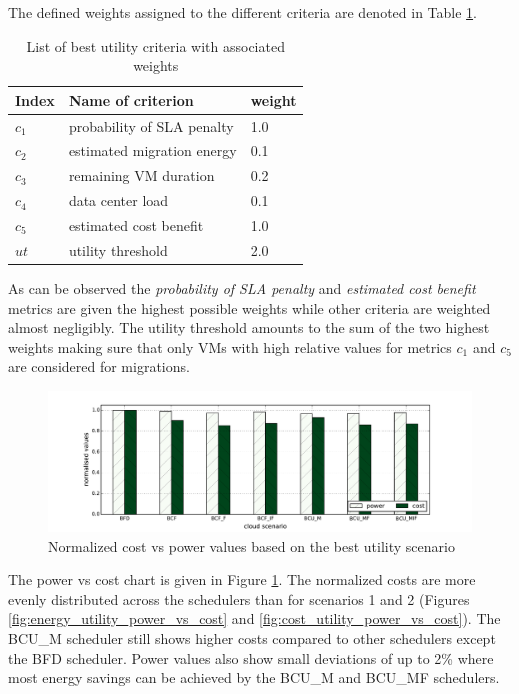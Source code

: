 The defined weights assigned to the different criteria are denoted in Table \ref{tab:list_of_best_utility_criteria_weights}. 

\begin{table}[htbp]
\centering
\begin{tabular}{lll}
\toprule
	Index & Name of criterion	& weight \\
\midrule
	$c_1$ & probability of SLA penalty & 1.0 \\
	$c_2$ & estimated migration energy & 0.1 \\
	$c_3$ & remaining VM duration & 0.2 \\
	$c_4$ & data center load & 0.1 \\
	$c_5$ & estimated cost benefit & 1.0 \\
	$ut$ & utility threshold & 2.0 \\
\bottomrule
\end{tabular}
\caption{List of best utility criteria with associated weights}
\label{tab:list_of_best_utility_criteria_weights}
\end{table}

As can be observed the \textit{probability of SLA penalty} and \textit{estimated cost benefit} metrics are given the highest possible weights while other criteria are weighted almost negligibly. The utility threshold amounts to the sum of the two highest weights making sure that only VMs with high relative values for metrics $c_1$ and $c_5$ are considered for migrations. 

\begin{figure}[bp]
	\centering
		\includegraphics[width=1.00\textwidth]{figures/evaluation_and_results/best_utility_power_vs_cost.pdf}
	\caption{Normalized cost vs power values based on the best utility scenario}
	\label{fig:best_utility_power_vs_cost}
\end{figure}

The power vs cost chart is given in Figure \ref{fig:best_utility_power_vs_cost}. 
The normalized costs are more evenly distributed across the schedulers than for scenarios 1 and 2 (Figures \ref{fig:energy_utility_power_vs_cost} and \ref{fig:cost_utility_power_vs_cost}). The BCU\_M scheduler still shows higher costs compared to other schedulers except the BFD scheduler. 
Power values also show small deviations of up to 2\% where most energy savings can be achieved by the BCU\_M and BCU\_MF schedulers. 

